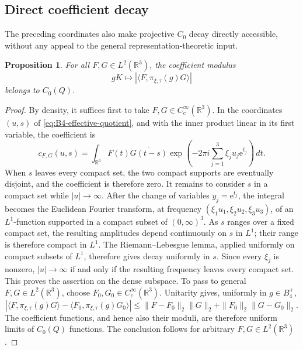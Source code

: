 \documentclass[reqno]{amsart}
\numberwithin{equation}{section}
\newtheorem{proposition}[theorem]{Proposition}
\theoremstyle{definition}
\theoremstyle{remark}
\newcommand{\R}{\mathbb R}
\newcommand{\e}{\mathrm e}
\begin{document}
\subsection{Direct coefficient decay}

The preceding coordinates also make projective $C_0$ decay directly
accessible, without any appeal to the general representation-theoretic
input.

\begin{proposition}
\label{prop:B4-direct-C0}
For all $F,G\in L^2(\R^3)$, the coefficient modulus
\[
 gK\longmapsto
 \left|\langle F,\pi_{\xi,\tau}(g)G\rangle\right|
\]
belongs to $C_0(Q)$.
\end{proposition}

\begin{proof}
By density, it suffices first to take $F,G\in C_c^\infty(\R^3)$.  In the
coordinates $(u,s)$ of \eqref{eq:B4-effective-quotient}, and with the inner
product linear in its first variable, the coefficient is
\begin{equation}
 c_{F,G}(u,s)
 =\int_{\R^3}
 F(t)\overline{G(t-s)}
 \exp\left(
 -2\pi i\sum_{j=1}^3\xi_ju_j\e^{t_j}
 \right)\,dt.
 \label{eq:B4-coefficient}
\end{equation}
When $s$ leaves every compact set, the two compact supports are eventually
disjoint, and the coefficient is therefore zero.  It remains to consider
$s$ in a compact set while $|u|\to\infty$.  After the change of variables
$y_j=\e^{t_j}$, the integral becomes the Euclidean Fourier transform, at
frequency
$(\xi_1u_1,\xi_2u_2,\xi_3u_3)$, of an $L^1$-function supported in a compact
subset of $(0,\infty)^3$.  As $s$ ranges over a fixed compact set, the
resulting amplitudes depend continuously on $s$ in $L^1$; their range is
therefore compact in $L^1$.  The Riemann--Lebesgue lemma, applied uniformly
on compact subsets of $L^1$, therefore gives decay uniformly in $s$.  Since every $\xi_j$
is nonzero, $|u|\to\infty$ if and only if the resulting frequency leaves
every compact set.  This proves the assertion on the dense subspace.  To
pass to general $F,G\in L^2(\R^3)$, choose
$F_0,G_0\in C_c^\infty(\R^3)$.  Unitarity gives, uniformly in
$g\in B_4^+$,
\[
 \left|
 \langle F,\pi_{\xi,\tau}(g)G\rangle-
 \langle F_0,\pi_{\xi,\tau}(g)G_0\rangle
 \right|
 \leq
 \|F-F_0\|_2\|G\|_2+
 \|F_0\|_2\|G-G_0\|_2.
\]
The coefficient functions, and hence also their moduli, are therefore
uniform limits of $C_0(Q)$ functions.  The conclusion follows for arbitrary
$F,G\in L^2(\R^3)$.
\end{proof}
\end{document}
